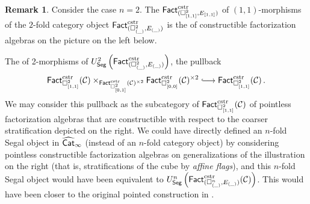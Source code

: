 \documentclass[10pt, reqno, twoside
, final
]{amsart}
\numberwithin{equation}{subsection}%
\theoremstyle{definition}
\theoremstyle{definition}
\theoremstyle{definition}
\theoremstyle{definition}
\theoremstyle{definition}
\theoremstyle{definition}
\theoremstyle{definition}
\theoremstyle{definition}
\theoremstyle{definition}
\theoremstyle{plain}
\theoremstyle{definition}
\theoremstyle{plain}
\theoremstyle{definition}
\theoremstyle{plain}
\theoremstyle{definition}
\newtheorem{rmk}[defn]{Remark}
\theoremstyle{definition}
\theoremstyle{plain}
\theoremstyle{plain}
\theoremstyle{definition}
\theoremstyle{plain}
\theoremstyle{plain}
\theoremstyle{plain}
\begin{document}
\begin{rmk}
Consider the case $n=2$. The \infcat $\mathsf{Fact}^{\mathrm{cstr}}_{(\square^2_{[1,1]},E_{[1,1]})}$ of $(1,1)$-morphisms of the $2$-fold category object $\mathsf{Fact}^{\mathrm{cstr}}_{(\square^2_{(\_)},E_{(\_)})}$ is the \infcat of constructible factorization algebras on the picture on the left below.

\vspace{0.3cm}
{\centering {} \hspace{1.5cm} \par  }
\vspace{0.2cm}
\noindent 

The \infcat of 2-morphisms of $U^2_{\mathsf{Seg}}\left(\mathsf{Fact}^{\mathrm{cstr}}_{(\square^2_{(\_)},E_{(\_)})}\right)$, the pullback 
\[  \Fact^{\mathrm{cstr}}_{\square^2_{[1,1]}}(\icat)\times_{\Fact^{\mathrm{cstr}}_{\square^2_{[0,1]}}(\icat)^{\times 2}}\Fact^{\mathrm{cstr}}_{\square^2_{[0,0]}}(\icat)^{\times 2}\hooklongrightarrow \Fact^{\mathrm{cstr}}_{\square^2_{[1,1]}}(\icat) \,.\]
We may consider this pullback as the subcategory of $\mathsf{Fact}^{\mathrm{cstr}}_{\square^2_{[1,1]}}(\mathcal{C})$ of pointless factorization algebras that are constructible with respect to the coarser stratification depicted on the right. We could have directly defined an $n$-fold Segal object in $\widehat{\mathsf{Cat}}_{\infty}$ (instead of an $n$-fold category object) by considering pointless constructible factorization algebras on generalizations of the illustration on the right (that is, stratifications of the cube by \emph{affine flags}), and this $n$-fold Segal object would have been equivalent to $U^n_{\mathsf{Seg}}\left(\mathsf{Fact}^{\mathrm{cstr}}_{(\square^n_{(\_)},E_{(\_)})}(\mathcal{C})\right)$.
This would have been closer to the original pointed construction in \cite{Scheimbauer}.
\end{rmk}
\end{document}
